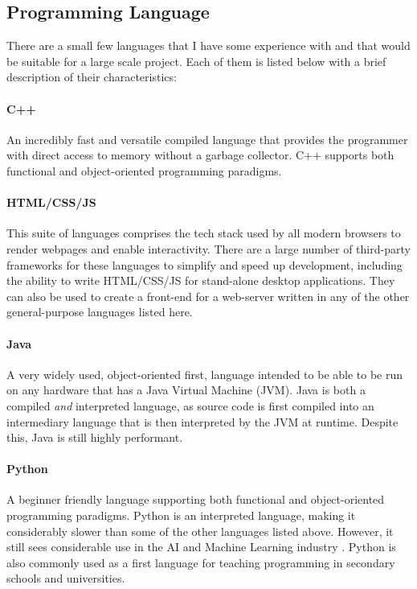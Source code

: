 \documentclass{report}
\begin{document}
\subsection{Programming Language}
There are a small few languages that I have some experience with and that would
be suitable for a large scale project. Each of them is listed below with a
brief description of their characteristics:

\paragraph{C++}
An incredibly fast and versatile compiled language that provides the
programmer with direct access to memory without a garbage collector.
C++ supports both functional and object-oriented programming paradigms.

\paragraph{HTML/CSS/JS}
This suite of languages comprises the tech stack used by all modern browsers to
render webpages and enable interactivity. There are a large number of
third-party frameworks for these languages to simplify and speed up development,
including the ability to write HTML/CSS/JS for stand-alone desktop applications.
They can also be used to create a front-end for a web-server written in any of
the other general-purpose languages listed here.

\paragraph{Java}
A very widely used, object-oriented first, language intended to be able to be
run on any hardware that has a Java Virtual Machine (JVM). Java is both a
compiled \textit{and} interpreted language, as source code is first compiled
into an intermediary language that is then interpreted by the JVM at runtime.
Despite this, Java is still highly performant.

\paragraph{Python}
A beginner friendly language supporting both functional and object-oriented
programming paradigms. Python is an interpreted language, making it
considerably slower than some of the other languages listed above. However, it
still sees considerable use in the AI and Machine Learning industry
\cite{octoverseinsights}. Python is also commonly used as a first language for
teaching programming in secondary schools \cite{hadwenbennett2024programming}
and universities.
\vspace{3.25ex}
\end{document}
